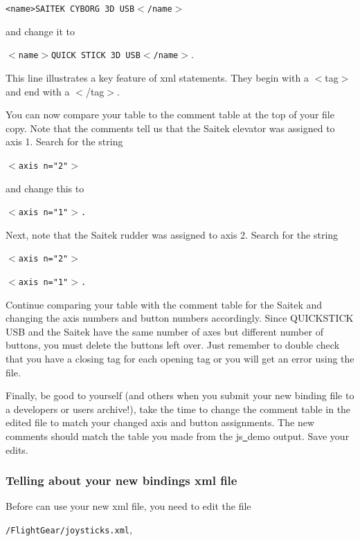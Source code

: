 \texttt{<name>SAITEK CYBORG 3D USB$<$/name$>$}
\medskip

\noindent
and change it to
\medskip

	\texttt{$<$name$>$QUICK STICK 3D USB$<$/name$>$}.
	\medskip

\noindent
This line illustrates a key feature of xml statements.  They begin with a $<$tag$>$ and end with a $<$/tag$>$.  

You can now compare your table to the comment table at the top of your file copy.  Note that the comments tell us that the Saitek elevator was assigned to axis 1.  Search for the string
\medskip

	\texttt{$<$axis n="2"$>$}
\medskip

\noindent	
and change this to 
\medskip

	\texttt{$<$axis n="1"$>$.}
\medskip	

Next, note that the Saitek rudder was assigned to axis 2.  Search for the string
\medskip

	\texttt{$<$axis n="2"$>$}
	
	\texttt{$<$axis n="1"$>$.}
\medskip

\noindent	
Continue comparing your table with the comment table for the Saitek and changing the axis numbers and button numbers accordingly.  Since QUICKSTICK USB and the Saitek have the same number of axes but different number of buttons, you must delete the buttons left over.  Just remember to double check that you have a closing tag for each opening tag or you will get an error using the file.

Finally, be good to yourself (and others when you submit your new binding file to a \FlightGear{} developers or users archive!), take the time to change the comment table in the edited file to match your changed axis and button assignments.  The new comments should match the table you made from the js\underline{~}demo output.  Save your edits.


\subsubsection{Telling \FlightGear{} about your new bindings xml file\label{telling}}
Before \FlightGear{} can use your new xml file, you need to edit the file

\noindent
 \texttt{/FlightGear/joysticks.xml},



